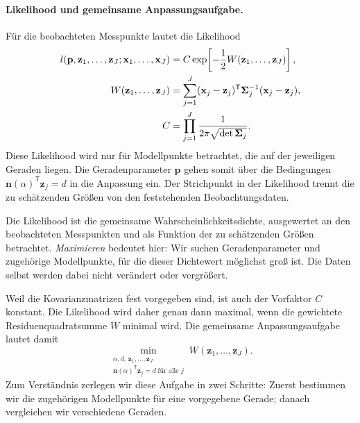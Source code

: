 \paragraph{Likelihood und gemeinsame Anpassungsaufgabe.}
Für die beobachteten Messpunkte lautet die Likelihood
\begin{align}
l(\mathbf{p},\mathbf{z}_1,\ldots,\mathbf{z}_J;
  \mathbf{x}_1,\ldots,\mathbf{x}_J)
&=C\exp\!\left[-\frac12
 W(\mathbf{z}_1,\ldots,\mathbf{z}_J)\right],
\label{V4GeradeLikelihood}\\
W(\mathbf{z}_1,\ldots,\mathbf{z}_J)
&=\sum_{j=1}^{J}
(\mathbf{x}_j-\mathbf{z}_j)^\mathsf{T}
\boldsymbol{\Sigma}_j^{-1}(\mathbf{x}_j-\mathbf{z}_j),
\label{V4GeradeGemeinsameKosten}\\
C&=\prod_{j=1}^{J}\frac{1}{2\pi\sqrt{\det\boldsymbol{\Sigma}_j}}.
\notag
\end{align}
Diese Likelihood wird nur für Modellpunkte betrachtet, die auf der
jeweiligen Geraden liegen. Die Geradenparameter $\mathbf{p}$ gehen
somit über die Bedingungen
$\mathbf{n}(\alpha)^\mathsf{T}\mathbf{z}_j=d$ in die Anpassung ein.
Der Strichpunkt in der Likelihood trennt die zu schätzenden Größen
von den feststehenden Beobachtungsdaten.

Die Likelihood ist die gemeinsame Wahrscheinlichkeitsdichte,
ausgewertet an den beobachteten Messpunkten und als Funktion der zu
schätzenden Größen betrachtet. \emph{Maximieren} bedeutet hier:
Wir suchen Geradenparameter und zugehörige Modellpunkte, für die
dieser Dichtewert möglichst groß ist. Die Daten selbst werden dabei
nicht verändert oder vergrößert.

Weil die Kovarianzmatrizen fest vorgegeben sind, ist auch der
Vorfaktor $C$ konstant. Die Likelihood wird daher genau dann maximal,
wenn die gewichtete Residuenquadratsumme $W$ minimal wird.
Die gemeinsame Anpassungsaufgabe lautet damit
\begin{equation}
\min_{\substack{\alpha,d,\,\mathbf{z}_1,\ldots,\mathbf{z}_J\\
\mathbf{n}(\alpha)^\mathsf{T}\mathbf{z}_j=d\;\text{für alle }j}}
W(\mathbf{z}_1,\ldots,\mathbf{z}_J).
\label{V4GeradeGemeinsameAnpassung}
\end{equation}
Zum Verständnis zerlegen wir diese Aufgabe in zwei Schritte:
Zuerst bestimmen wir die zugehörigen Modellpunkte für eine vorgegebene
Gerade; danach vergleichen wir verschiedene Geraden.

